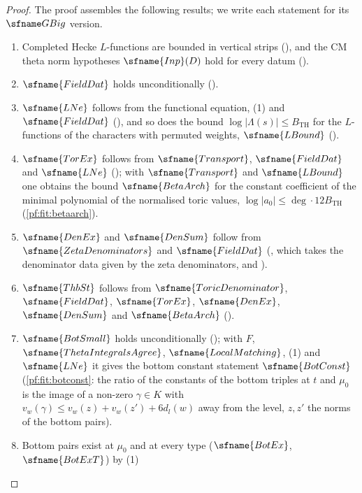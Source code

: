 \begin{proof}
The proof assembles the following results; we write each statement for its $\fitGBig$ version.
\begin{enumerate}[label=(\arabic*),leftmargin=*]
\item Completed Hecke $L$-functions are bounded in vertical strips
(), and the CM theta norm hypotheses $\sfname{Inp}(D)$
hold for every datum ().
\item $\sfname{FieldDat}$ holds unconditionally ().
\item $\sfname{LNe}$ follows from the functional equation, (1) and $\sfname{FieldDat}$
(), and so does the bound
$\log|\Lambda(s)|\le B_{\mathrm{TH}}$ for the $L$-functions of the characters with permuted weights, $\sfname{LBound}$
().
\item $\sfname{TorEx}$ follows from $\sfname{Transport}$, $\sfname{FieldDat}$ and $\sfname{LNe}$
(); with $\sfname{Transport}$ and $\sfname{LBound}$ one obtains the bound $\sfname{BetaArch}$ for the
constant coefficient of the minimal polynomial of the normalised toric values,
$\log|a_0|\le\deg\cdot12B_{\mathrm{TH}}$ (\cref{pf:fit:betaarch}).
\item $\sfname{DenEx}$ and $\sfname{DenSum}$ follow from $\sfname{ZetaDenominators}$ and $\sfname{FieldDat}$
(, which takes the denominator data given by the zeta denominators, and
).
\item $\sfname{ThbSt}$ follows from $\sfname{ToricDenominator}$, $\sfname{FieldDat}$, $\sfname{TorEx}$, $\sfname{DenEx}$,
$\sfname{DenSum}$ and $\sfname{BetaArch}$ ().
\item $\sfname{BotSmall}$ holds unconditionally (); with
$F$, $\sfname{ThetaIntegralsAgree}$, $\sfname{LocalMatching}$, (1) and $\sfname{LNe}$ it gives the bottom constant statement
$\sfname{BotConst}$ (\cref{pf:fit:botconst}: the ratio of the constants of the bottom triples
at $t$ and $\mu_0$ is the image of a non-zero $\gamma\in K$ with $v_w(\gamma)\le v_w(z)+v_w(z')+6d_l(w)$ away from the
level, $z,z'$ the norms of the bottom pairs).
\item Bottom pairs exist at $\mu_0$ and at every type ($\sfname{BotEx}$, $\sfname{BotExT}$) by (1)

\end{enumerate}
\end{proof}
